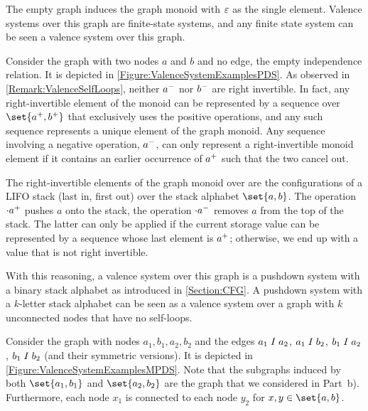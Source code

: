 \documentclass[../../diss.tex]{subfiles}
\begin{document}
\begin{example}%
\label{Example:ValenceSystemExamples}%
    \begin{thmenumerate}[a)]
        \item
            The empty graph induces the graph monoid with $\varepsilon$ as the single element.
            Valence systems over this graph are finite-state systems, and any finite state system can be seen a valence system over this graph.
        \item
            Consider the graph with two nodes $a$ and $b$ and no edge, \ie the empty independence relation.
            It is depicted in \cref{Figure:ValenceSystemExamplesPDS}.
%
            As observed in \cref{Remark:ValenceSelfLoops}, neither ${a}^-$ nor ${b}^-$ are right invertible.
            In fact, any right-invertible element of the monoid can be represented by a sequence over $\set{ \inc{a}, \inc{b} }$ that exclusively uses the positive operations, and any such sequence represents a unique element of the graph monoid.
            Any sequence involving a negative operation, \eg ${a}^-$, can only represent a right-invertible monoid element if it contains an earlier occurrence of ${a}^+$ such that the two cancel out.

            The right-invertible elements of the graph monoid over are the configurations of a LIFO stack (last in, first out) over the stack alphabet $\set{a,b}$.
            The operation $\cdot {a}^+$ pushes $a$ onto the stack, the operation $\cdot {a}^-$ removes $a$ from the top of the stack.
            The latter can only be applied if the current storage value can be represented by a sequence whose last element is ${a}^+$; otherwise, we end up with a value that is not right invertible.

            With this reasoning, a valence system over this graph is a pushdown system with a binary stack alphabet as introduced in \cref{Section:CFG}.
            A pushdown system with a $k$-letter stack alphabet can be seen as a valence system over a graph with $k$ unconnected nodes that have no self-loops.
        \item
            Consider the graph with nodes ${a_1,b_1,a_2,b_2}$ and the edges $a_1 \mathrel{I} a_2$, $a_1 \mathrel{I} b_2$, $b_1 \mathrel{I} a_2$, $b_1 \mathrel{I} b_2$ (and their symmetric versions).
            It is depicted in \cref{Figure:ValenceSystemExamplesMPDS}.
            Note that the subgraphs induced by both $\set{a_1,b_1}$ and $\set{a_2,b_2}$ are the graph that we considered in Part~b).
            Furthermore, each node $x_1$ is connected to each node $y_2$ for $x,y \in \set{a,b}$.


\end{thmenumerate}
\end{example}
\end{document}
